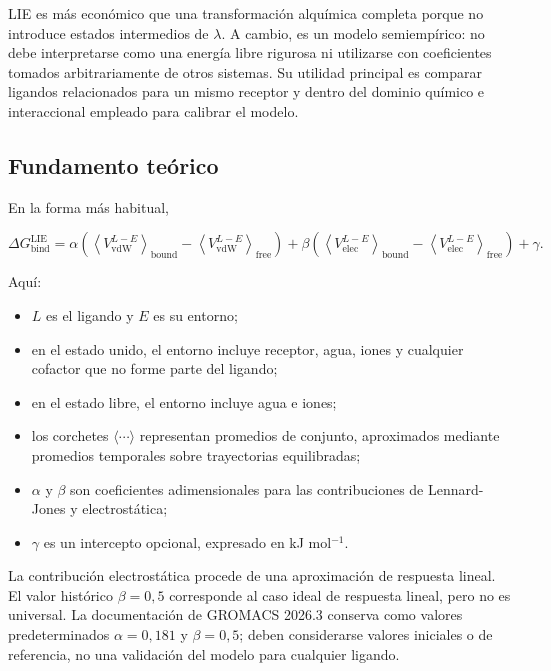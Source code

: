 \documentclass[
  spanish,
  11pt,
  a4paper]{article}
\providecommand{\tightlist}{%
  \setlength{\itemsep}{0pt}\setlength{\parskip}{0pt}}
\begin{document}
LIE es más económico que una transformación alquímica completa porque no
introduce estados intermedios de \(\lambda\). A cambio, es un modelo
semiempírico: no debe interpretarse como una energía libre rigurosa ni
utilizarse con coeficientes tomados arbitrariamente de otros sistemas.
Su utilidad principal es comparar ligandos relacionados para un mismo
receptor y dentro del dominio químico e interaccional empleado para
calibrar el modelo.

\subsection{Fundamento teórico}\label{fundamento-teuxf3rico}

En la forma más habitual,

\[
\Delta G_{\mathrm{bind}}^{\mathrm{LIE}}
=
\alpha\left(
\left\langle V_{\mathrm{vdW}}^{L-E}\right\rangle_{\mathrm{bound}}
-
\left\langle V_{\mathrm{vdW}}^{L-E}\right\rangle_{\mathrm{free}}
\right)
+
\beta\left(
\left\langle V_{\mathrm{elec}}^{L-E}\right\rangle_{\mathrm{bound}}
-
\left\langle V_{\mathrm{elec}}^{L-E}\right\rangle_{\mathrm{free}}
\right)
+
\gamma .
\]

Aquí:

\begin{itemize}
\tightlist
\item
  \(L\) es el ligando y \(E\) es su entorno;
\item
  en el estado unido, el entorno incluye receptor, agua, iones y
  cualquier cofactor que no forme parte del ligando;
\item
  en el estado libre, el entorno incluye agua e iones;
\item
  los corchetes \(\langle\cdots\rangle\) representan promedios de
  conjunto, aproximados mediante promedios temporales sobre trayectorias
  equilibradas;
\item
  \(\alpha\) y \(\beta\) son coeficientes adimensionales para las
  contribuciones de Lennard-Jones y electrostática;
\item
  \(\gamma\) es un intercepto opcional, expresado en kJ mol\(^{-1}\).
\end{itemize}

La contribución electrostática procede de una aproximación de respuesta
lineal. El valor histórico \(\beta=0{,}5\) corresponde al caso ideal de
respuesta lineal, pero no es universal. La documentación de GROMACS
2026.3 conserva como valores predeterminados \(\alpha=0{,}181\) y
\(\beta=0{,}5\); deben considerarse valores iniciales o de referencia,
no una validación del modelo para cualquier ligando.
\end{document}
